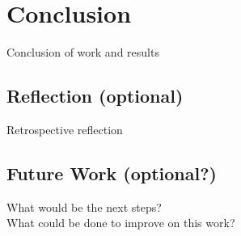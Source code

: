 \chapter{Conclusion} \label{chapter:Conclusion}
Conclusion of work and results
\section{Reflection (optional)}
Retrospective reflection
\section{Future Work (optional?)}
What would be the next steps? \\
What could be done to improve on this work?

